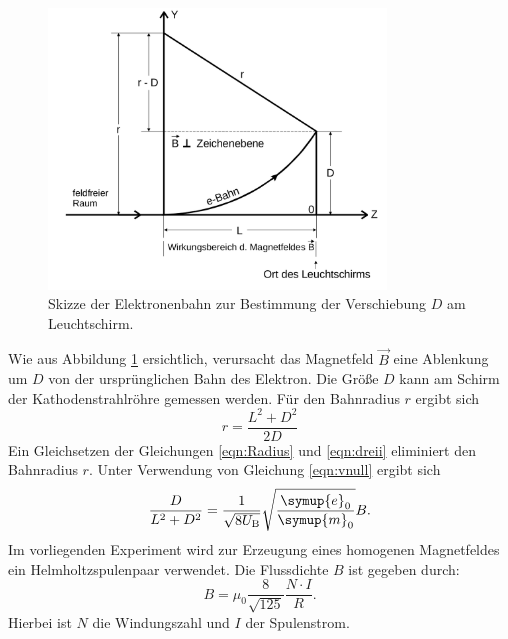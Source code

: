 \begin{figure}
  \centering
  \includegraphics[width=0.8\textwidth]{Messdaten/ablenkungbfeld.png}
  \caption{Skizze der Elektronenbahn zur Bestimmung der Verschiebung $D$ am Leuchtschirm.}
  \label{fig:D}
\end{figure}
Wie aus Abbildung \ref{fig:D} ersichtlich, verursacht das Magnetfeld $\vec{B}$ eine Ablenkung um $D$ von der ursprünglichen Bahn des Elektron.
Die Größe $D$ kann am Schirm der Kathodenstrahlröhre gemessen werden.
Für den Bahnradius $r$ ergibt sich
\begin{equation}
  \label{eqn:dreii}
  r=\frac{L^2+D^2}{2D}
\end{equation}
Ein Gleichsetzen der Gleichungen \eqref{eqn:Radius} und \eqref{eqn:dreii} eliminiert den Bahnradius $r$. Unter Verwendung von Gleichung \eqref{eqn:vnull} ergibt sich
\begin{equation}
  \label{eqn:bfeld1}
  \frac{D}{L^2+D^2}=\frac{1}{\sqrt{8U_\mathrm{B}}}\sqrt{\frac{\symup{e}_0}{\symup{m}_0}}B \text{.}
\end{equation}
Im vorliegenden Experiment wird zur Erzeugung eines homogenen Magnetfeldes ein Helmholtzspulenpaar verwendet.
Die Flussdichte $B$ ist gegeben durch:
\begin{equation}
  B=\mu_0\frac{8}{\sqrt{125}}\frac{N\cdot I}{R} \text{.}
\end{equation}
Hierbei ist $N$ die Windungszahl und $I$ der Spulenstrom.
